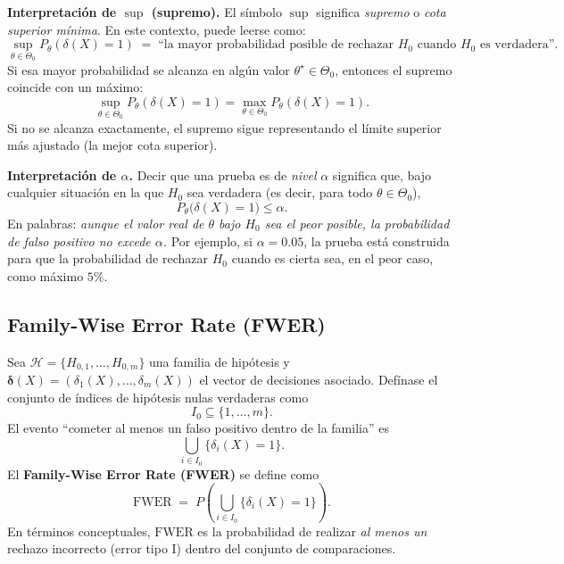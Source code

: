 \textbf{Interpretación de $\sup$ (supremo).} El símbolo $\sup$ significa \emph{supremo} o \emph{cota superior mínima}. En este contexto, puede leerse como:
\[
\sup_{\theta\in\Theta_0} P_\theta(\delta(X)=1) \;=\; \text{``la mayor probabilidad posible de rechazar $H_0$ cuando $H_0$ es verdadera''}.
\]
Si esa mayor probabilidad se alcanza en algún valor $\theta^\star\in\Theta_0$, entonces el supremo coincide con un máximo:
\[
\sup_{\theta\in\Theta_0} P_\theta(\delta(X)=1)=\max_{\theta\in\Theta_0} P_\theta(\delta(X)=1).
\]
Si no se alcanza exactamente, el supremo sigue representando el límite superior más ajustado (la mejor cota superior).

\textbf{Interpretación de $\alpha$.} Decir que una prueba es de \emph{nivel} $\alpha$ significa que, bajo cualquier situación en la que $H_0$ sea verdadera (es decir, para todo $\theta\in\Theta_0$),
\[
P_\theta\big(\delta(X)=1\big)\le \alpha.
\]
En palabras: \emph{aunque el valor real de $\theta$ bajo $H_0$ sea el peor posible, la probabilidad de falso positivo no excede $\alpha$.}
Por ejemplo, si $\alpha=0.05$, la prueba está construida para que la probabilidad de rechazar $H_0$ cuando es cierta sea, en el peor caso, como máximo $5\%$.

\subsection{Family-Wise Error Rate (FWER)}
Sea $\mathcal{H}=\{H_{0,1},\dots,H_{0,m}\}$ una familia de hipótesis y $\boldsymbol{\delta}(X)=(\delta_1(X),\dots,\delta_m(X))$ el vector de decisiones asociado. 
Defínase el conjunto de índices de hipótesis nulas verdaderas como
\[
I_0 \subseteq \{1,\dots,m\}.
\]
El evento ``cometer al menos un falso positivo dentro de la familia'' es
\[
\bigcup_{i\in I_0}\{\delta_i(X)=1\}.
\]
El \textbf{Family-Wise Error Rate (FWER)} se define como
\[
\mathrm{FWER}
\;=\;
P\!\left(\bigcup_{i\in I_0}\{\delta_i(X)=1\}\right).
\]
En términos conceptuales, $\mathrm{FWER}$ es la probabilidad de realizar \emph{al menos un} rechazo incorrecto (error tipo I) dentro del conjunto de comparaciones.
